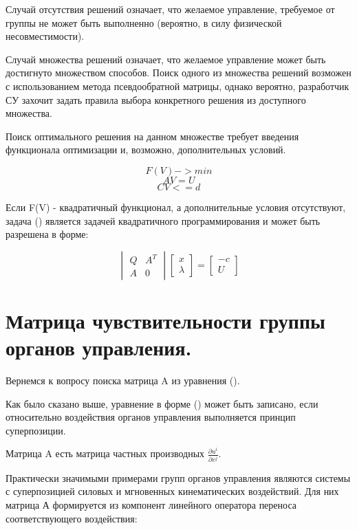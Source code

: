\documentclass[a4paper]{article}
\begin{document}
Случай отсутствия решений означает, что желаемое управление, требуемое от группы не может быть выполненно (вероятно, в силу физической несовместимости). 

Случай множества решений означает, что желаемое управление может быть достигнуто множеством способов. 
Поиск одного из множества решений возможен с использованием метода псевдообратной матрицы, однако вероятно, разработчик СУ захочит задать правила выбора конкретного решения из доступного множества.

Поиск оптимального решения на данном множестве требует введения функционала оптимизации и, возможно, дополнительных условий.

\begin{equation}F(V) -> min\end{equation}
\begin{equation}AV = U\end{equation}
\begin{equation}CV <= d\end{equation}

Если F(V) - квадратичный функционал, а дополнительные условия отсутствуют, задача () является задачей квадратичного программирования и может быть разрешена в форме:

\begin{equation}
\begin{vmatrix}
Q & A^T\\
A & 0
\end{vmatrix}
\begin{bmatrix}
x\\
\lambda
\end{bmatrix}
=
\begin{bmatrix}
-c\\
U
\end{bmatrix}
\end{equation}

\section{Матрица чувствительности группы органов управления.}
Вернемся к вопросу поиска матрица A из уравнения ().

Как было сказано выше, уравнение в форме () может быть записано, если относительно воздействия органов управления выполняется принцип суперпозиции. 

Матрица A есть матрица частных производных $\frac{\partial{u^i}}{\partial{v^j}}$.

Практически значимыми примерами групп органов управления являются системы с суперпозицией силовых и мгновенных кинематических воздействий. Для них матрица А формируется из компонент линейного оператора переноса соответствующего воздействия:
\end{document}
